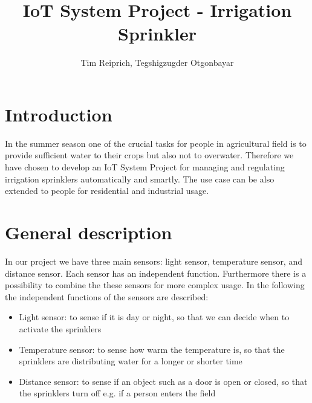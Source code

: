 \documentclass{article}
\title{IoT System Project - Irrigation Sprinkler}
\author{Tim Reiprich, Tegshigzugder Otgonbayar}
\begin{document}
\pagestyle{plain}  %

\maketitle


\newpage

\tableofcontents %
\newpage


\section{Introduction}
In the summer season one of the crucial tasks for people in agricultural field is to provide sufficient water to their crops but also not to overwater. Therefore we have chosen to develop an IoT System Project for managing and regulating irrigation sprinklers automatically and smartly. The use case can be also extended to people for residential and industrial usage. 

\section{General description}
In our project we have three main sensors: light sensor, temperature sensor, and distance sensor. Each sensor has an independent function. Furthermore there is a possibility to combine the these sensors for more complex usage.
In the following the independent functions of the sensors are described:
\begin{itemize}
	\item Light sensor: to sense if it is day or night, so that we can decide when to activate the sprinklers
	\item Temperature sensor: to sense how warm the temperature is, so that the sprinklers are distributing water for a longer or shorter time
	\item Distance sensor: to sense if an object such as a door is open or closed, so that the sprinklers turn off e.g. if a person enters the field
\end{itemize}
  
\end{document}
